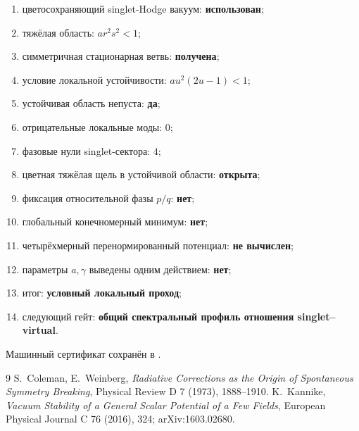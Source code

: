\begin{protocol}
\begin{enumerate}
 \item цветосохраняющий singlet-Hodge вакуум: \textbf{использован};
 \item тяжёлая область: \textbf{$ar^2s^2<1$};
 \item симметричная стационарная ветвь: \textbf{получена};
 \item условие локальной устойчивости: \textbf{$au^2(2u-1)<1$};
 \item устойчивая область непуста: \textbf{да};
 \item отрицательные локальные моды: \textbf{$0$};
 \item фазовые нули singlet-сектора: \textbf{$4$};
 \item цветная тяжёлая щель в устойчивой области: \textbf{открыта};
 \item фиксация относительной фазы $p/q$: \textbf{нет};
 \item глобальный конечномерный минимум: \textbf{нет};
 \item четырёхмерный перенормированный потенциал: \textbf{не вычислен};
 \item параметры $a,\gamma$ выведены одним действием: \textbf{нет};
 \item итог: \textbf{условный локальный проход};
 \item следующий гейт: \textbf{общий спектральный профиль отношения
 singlet--virtual}.
\end{enumerate}
\end{protocol}

Машинный сертификат сохранён в
.

\begin{thebibliography}{9}
S.~Coleman, E.~Weinberg,
\emph{Radiative Corrections as the Origin of Spontaneous Symmetry Breaking},
Physical Review D 7 (1973), 1888--1910.
K.~Kannike,
\emph{Vacuum Stability of a General Scalar Potential of a Few Fields},
European Physical Journal C 76 (2016), 324; arXiv:1603.02680.
\end{thebibliography}